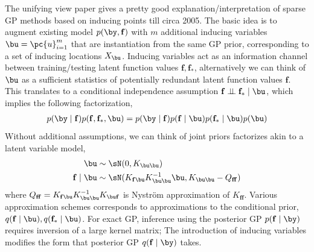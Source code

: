 \documentclass[11pt]{article}
\renewcommand\bf{\ensuremath{\mathbf{f}}}
\begin{document}
The unifying view paper \cite{quinonero-candelaUnifyingViewSparse2005} gives a pretty good explanation/interpretation of sparse GP methods based on inducing points till circa 2005. The basic idea is to augment existing model $p(\by,\bf)$ with $m$ additional inducing variables $\bu = \pc{u}_{i=1}^m$ that are instantiation from the same GP prior, corresponding to a set of inducing locations $X_{\bu}$. Inducing variables act as an information channel between training/testing latent function values $\bf,\bf_*$, alternatively we can think of $\bu$ as a sufficient statistics of potentially redundant latent function values $\bf$. This translates to a conditional independence assumption $\bf \dperp \bf_* \mid \bu$, which implies the following factorization,
\begin{align}
    p(\by\mid\bf)p(\bf,\bf_*,\bu)
        = p(\by\mid\bf) p(\bf\mid \bu) p(\bf_*\mid \bu) p(\bu)
\end{align}
Without additional assumptions, we can think of joint priors factorizes akin to a latent variable model,
\begin{align}
    \bu
        &\sim \sN(0, K_{\bu\bu}) \\ 
    \bf\mid\bu
        &\sim \sN( K_{\bf\bu}K_{\bu\bu}^{-1} \bu, K_{\bu\bu} - Q_{\bf\bf} ) 
    \label{eq:inducing_variables_conditional_prior}
\end{align}
where $Q_{\bf\bf}=K_{\bf\bu}K_{\bu\bu}^{-1}K_{\bu\bf}$ is Nystr\"om approximation of $K_{\bf\bf}$. Various approximation schemes corresponds to approximations to the conditional prior, $q(\bf\mid \bu), q(\bf_* \mid \bu)$. For exact GP, inference using the posterior GP $p(\bf\mid\by)$ requires inversion of a large kernel matrix; The introduction of inducing variables modifies the form that posterior GP $q(\bf\mid\by)$ takes.
\end{document}
